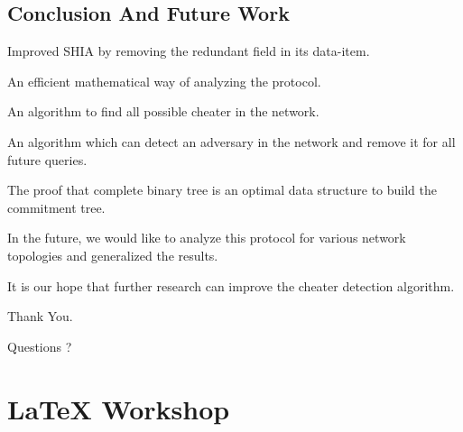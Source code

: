 \documentclass[%
  slidesonly,%
  semlayer%
  ]{seminar}                                  %
\begin{document}
\begin{slide}
    \subsection*{Conclusion And Future Work}
      \vfill
      Improved SHIA by removing the redundant field in its data-item.
      
      An efficient mathematical way of analyzing the protocol. 
      
      An algorithm to find all possible cheater in the network.
      
      An algorithm which can detect an adversary in the network and remove it for all future queries.
      
      The proof that complete binary tree is an optimal data structure to build the commitment tree.

      In the future, we would like to analyze this protocol for various network topologies and generalized the results.

      It is our hope that further research can improve the cheater detection algorithm.

      \vfill
      \clearpage
      \vfill
        \begin{center}
          \Huge 
          Thank You.  

          Questions ?
        \end{center}
      \clearpage

\section*{\LaTeX{ } Workshop}

\vspace{.75in}

\end{slide}
\end{document}

